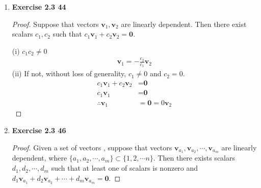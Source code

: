 \begin{enumerate}
\begin{proof}
		\noindent \textbf{(c)} Let $\textbf{v}_1 = \begin{bmatrix}
			1 \\ 0 \\ 0
		\end{bmatrix}, \textbf{v}_2 = \begin{bmatrix}
			1 \\ 1 \\ 0
		\end{bmatrix}, \textbf{v}_3 = \begin{bmatrix}
			1 \\ 1 \\ 1
		\end{bmatrix}$, then $\textbf{v}_1 = \textbf{e}_1$, $\textbf{v}_2 = \textbf{e}_1 + \textbf{e}_2$, and $\textbf{v}_3 = \textbf{e}_1 + \textbf{e}_2 + \textbf{e}_3$. Also, $\textbf{e}_1 = \textbf{v}_1$, $\textbf{e}_2 = \textbf{v}_2 - \textbf{v}_1$, and $\textbf{e}_3 = \textbf{v}_3 - \textbf{v}_2$. Since span($\textbf{e}_1, \textbf{e}_2, \textbf{e}_3$) = $\mathbb{R}^3$, by (b),  span($\textbf{v}_1 , \textbf{v}_2, \textbf{v}_3$) = span($\textbf{e}_1, \textbf{e}_2, \textbf{e}_3$) = $\mathbb{R}^3$.
	\end{proof}
	\item \textbf{Exercise 2.3 44}
	\begin{proof}
		Suppose that vectors $\textbf{v}_1, \textbf{v}_2$ are linearly dependent. Then there exist scalars $c_1, c_2$ such that $c_1\textbf{v}_1 + c_2\textbf{v}_2 = \textbf{0}$.
		
		\noindent (i) $c_1c_2 \neq 0$
		\begin{align*}
			\textbf{v}_1 = -\frac{c_2}{c_1}\textbf{v}_2
		\end{align*}
		\noindent (ii) If not, without loss of generality, $c_1 \neq 0$ and $c_2 = 0$.
		\begin{align*}
			c_1\textbf{v}_1 + c_2\textbf{v}_2 &= \textbf{0} \\
			c_1\textbf{v}_1 &= \textbf{0} \\
			\therefore \textbf{v}_1 &= \textbf{0} = 0\textbf{v}_2
		\end{align*}
	\end{proof}
	\item \textbf{Exercise 2.3 46}
	\begin{proof}
		Given a set of vectors \vn, suppose that vectors $\textbf{v}_{a_1}, \textbf{v}_{a_2}, \cdots, \textbf{v}_{a_m}$ are linearly dependent, where $\{a_1, a_2, \cdots, a_m\} \subset \{1, 2, \cdots n\}$. Then there exists scalars $d_1, d_2, \cdots, d_m$ such that at least one of scalars is nonzero and $d_1\textbf{v}_{a_1} + d_2\textbf{v}_{a_2} + \cdots + d_m\textbf{v}_{a_m} = \textbf{0}$.
		

\end{proof}
\end{enumerate}

